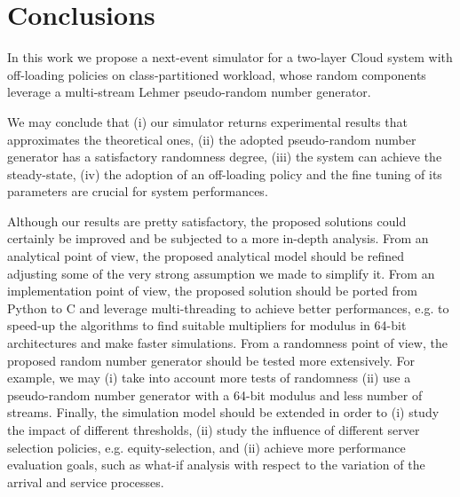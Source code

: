 \section{Conclusions}
\label{sec:conclusions}

In this work we propose a next-event simulator for a two-layer Cloud system with off-loading policies on class-partitioned workload, whose random components leverage a multi-stream Lehmer pseudo-random number generator.

We may conclude that 
(i) our simulator returns experimental results that approximates the theoretical ones, 
(ii) the adopted pseudo-random number generator has a satisfactory randomness degree,
(iii) the system can achieve the steady-state,
(iv) the adoption of an off-loading policy and the fine tuning of its parameters are crucial for system performances.

Although our results are pretty satisfactory, the proposed solutions could certainly be improved and be subjected to a more in-depth analysis.
%
From an analytical point of view, the proposed analytical model should be refined adjusting some of the very strong assumption we made to simplify it.
%
From an implementation point of view, the proposed solution should be ported from Python to C and leverage multi-threading to achieve better performances, e.g. to speed-up the algorithms to find suitable multipliers for modulus in 64-bit architectures and make faster simulations.
%
From a randomness point of view, the proposed random number generator should be tested more extensively. For example, we may (i) take into account more tests of randomness (ii) use a pseudo-random number generator with a 64-bit modulus and less number of streams.
%
Finally, the simulation model should be extended in order to 
(i) study the impact of different thresholds,
(ii) study the influence of different server selection policies, e.g. equity-selection, and 
(ii) achieve more performance evaluation goals, such as what-if analysis with respect to the variation of the arrival and service processes.
